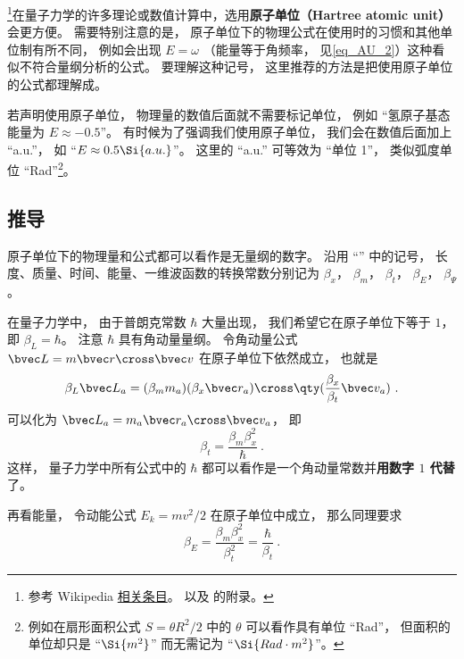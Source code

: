 

\footnote{参考 Wikipedia \href{https://en.wikipedia.org/wiki/Hartree_atomic_units}{相关条目}。 以及 \cite{Bransden} 的附录。}在量子力学的许多理论或数值计算中，选用\textbf{原子单位（Hartree atomic unit）}会更方便。 需要特别注意的是， 原子单位下的物理公式在使用时的习惯和其他单位制有所不同， 例如会出现 $E = \omega$ （能量等于角频率， 见\autoref{eq_AU_2}）这种看似不符合量纲分析的公式。 要理解这种记号， 这里推荐的方法是把使用原子单位的公式都理解成。


若声明使用原子单位， 物理量的数值后面就不需要标记单位， 例如 “氢原子基态能量为 $E \approx -0.5$”。 有时候为了强调我们使用原子单位， 我们会在数值后面加上 “a.u.”， 如 “$E \approx 0.5 \Si{a.u.}$”。 这里的 “a.u.” 可等效为 “单位 1”， 类似弧度单位 “Rad”\footnote{例如在扇形面积公式 $S = \theta R^2/2$ 中的 $\theta$ 可以看作具有单位 “Rad”， 但面积的单位却只是 “$\Si{m^2}$” 而无需记为 “$\Si{Rad\cdot m^2}$”。}。

\subsection{推导}\label{sub_AU_1}
原子单位下的物理量和公式都可以看作是无量纲的数字。 沿用 “” 中的记号， 长度、质量、时间、能量、一维波函数的转换常数分别记为 $\beta_x$， $\beta_m$， $\beta_t$， $\beta_E$， $\beta_\Psi$。

在量子力学中， 由于普朗克常数 $\hbar$ 大量出现， 我们希望它在原子单位下等于 $1$， 即 $\beta_L = \hbar$。 注意 $\hbar$ 具有角动量量纲。 令角动量公式 $\bvec L = m \bvec r \cross \bvec v$ 在原子单位下依然成立， 也就是
\begin{equation}\label{eq_AU_10}
\beta_L\bvec L_a = (\beta_m m_a) (\beta_x \bvec r_a) \cross \qty(\frac{\beta_x}{\beta_t} \bvec v_a)~.
\end{equation}
可以化为 $\bvec L_a = m_a \bvec r_a \cross \bvec v_a$， 即
\begin{equation}\label{eq_AU_6}
\beta_t = \frac{\beta_m \beta_x^2}{\hbar}~.
\end{equation}
这样， 量子力学中所有公式中的 $\hbar$ 都可以看作是一个角动量常数并\textbf{用数字 $1$ 代替}了。

再看能量， 令动能公式 $E_k = mv^2/2$ 在原子单位中成立， 那么同理要求
\begin{equation}\label{eq_AU_7}
\beta_E = \frac{\beta_m \beta_x^2}{\beta_t^2} = \frac{\hbar}{\beta_t}~.
\end{equation}


